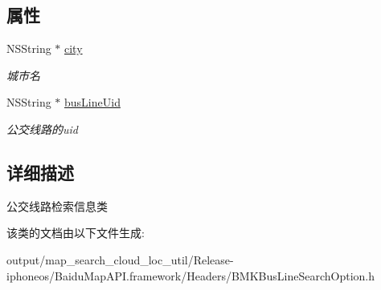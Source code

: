 \subsection*{属性}
\begin{DoxyCompactItemize}
\item 
\hypertarget{interface_b_m_k_bus_line_search_option_ac8dc465234c79e3882cddbd3e16ff21a}{}N\+S\+String $\ast$ \hyperlink{interface_b_m_k_bus_line_search_option_ac8dc465234c79e3882cddbd3e16ff21a}{city}\label{interface_b_m_k_bus_line_search_option_ac8dc465234c79e3882cddbd3e16ff21a}

\begin{DoxyCompactList}\small\item\em 城市名 \end{DoxyCompactList}\item 
\hypertarget{interface_b_m_k_bus_line_search_option_ac514e5b1930f97cecca6821562877146}{}N\+S\+String $\ast$ \hyperlink{interface_b_m_k_bus_line_search_option_ac514e5b1930f97cecca6821562877146}{bus\+Line\+Uid}\label{interface_b_m_k_bus_line_search_option_ac514e5b1930f97cecca6821562877146}

\begin{DoxyCompactList}\small\item\em 公交线路的uid \end{DoxyCompactList}\end{DoxyCompactItemize}


\subsection{详细描述}
公交线路检索信息类 

该类的文档由以下文件生成\+:\begin{DoxyCompactItemize}
\item 
output/map\+\_\+search\+\_\+cloud\+\_\+loc\+\_\+util/\+Release-\/iphoneos/\+Baidu\+Map\+A\+P\+I.\+framework/\+Headers/B\+M\+K\+Bus\+Line\+Search\+Option.\+h\end{DoxyCompactItemize}
